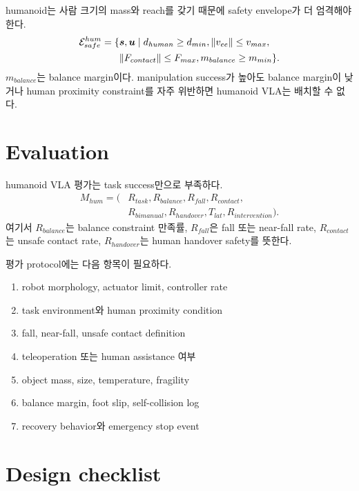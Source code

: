humanoid는 사람 크기의 mass와 reach를 갖기 때문에 safety envelope가 더 엄격해야 한다.
\begin{equation}
  \begin{aligned}
  \mathcal{E}_{safe}^{hum}
  =
  \{&
  \bm{s},\bm{u}
  \mid
  d_{human} \geq d_{min},
  \|v_{ee}\| \leq v_{max},\\
  &
  \|F_{contact}\| \leq F_{max},
  m_{balance} \geq m_{min}
  \}.
  \end{aligned}
  \label{eq:ch20-safety-envelope}
\end{equation}
$m_{balance}$는 balance margin이다. manipulation success가 높아도 balance margin이 낮거나 human proximity constraint를 자주 위반하면 humanoid VLA는 배치할 수 없다.

\section{Evaluation}

humanoid VLA 평가는 task success만으로 부족하다.
\begin{equation}
  \begin{aligned}
  M_{hum}
  =
  (&
  R_{task},
  R_{balance},
  R_{fall},
  R_{contact},\\
  &
  R_{bimanual},
  R_{handover},
  T_{lat},
  R_{intervention}
  ).
  \end{aligned}
  \label{eq:ch20-humanoid-metrics}
\end{equation}
여기서 $R_{balance}$는 balance constraint 만족률, $R_{fall}$은 fall 또는 near-fall rate, $R_{contact}$는 unsafe contact rate, $R_{handover}$는 human handover safety를 뜻한다.

평가 protocol에는 다음 항목이 필요하다.
\begin{enumerate}
  \item robot morphology, actuator limit, controller rate
  \item task environment와 human proximity condition
  \item fall, near-fall, unsafe contact definition
  \item teleoperation 또는 human assistance 여부
  \item object mass, size, temperature, fragility
  \item balance margin, foot slip, self-collision log
  \item recovery behavior와 emergency stop event
\end{enumerate}

\section{Design checklist}

